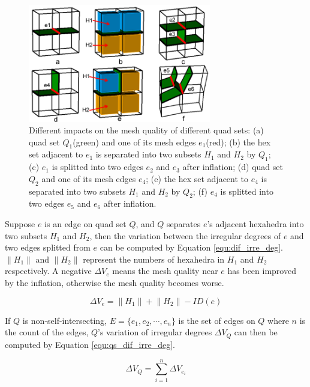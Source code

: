 \documentclass[final,5p,times,twocolumn]{elsarticle}
\begin{document}
\begin{figure}[htbp]
\begin{center}
\includegraphics[width=8cm]{figures/quality_impact_qs.png}
\caption{Different impacts on the mesh quality of different quad sets: (a) quad set $Q_1$(green) and one of its mesh edges $e_1$(red); (b) the hex set adjacent to $e_1$ is separated into two subsets $H_1$ and $H_2$ by $Q_1$; (c) $e_1$ is splitted into two edges $e_2$ and $e_3$ after inflation; (d) quad set $Q_2$ and one of its mesh edges $e_4$; (e) the hex set adjacent to $e_4$ is separated into two subsets $H_1$ and $H_2$ by $Q_2$; (f) $e_4$ is splitted into two edges $e_5$ and $e_6$ after inflation.}
\label{fig:quality_impact_qs}
\end{center}
\end{figure}

Suppose $e$ is an edge on quad set $Q$, and $Q$ separates $e$'s adjacent hexahedra into two subsets $H_1$ and $H_2$, then the variation between the irregular degrees of $e$ and two edges splitted from $e$ can be computed by Equation \ref{equ:dif_irre_deg}. $\left \| H_1 \right \|$ and $\left \| H_2 \right \|$ represent the numbers of hexahedra in $H_1$ and $H_2$ respectively. A negative $\Delta V_e$ means the mesh quality near $e$ has been improved by the inflation, otherwise the mesh quality becomes worse.

\begin{equation}
\label{equ:dif_irre_deg}
\Delta V_e=\left \| H_1 \right \| + \left \| H_2 \right \|-ID(e)
\end{equation}

If $Q$ is non-self-intersecting, $E=\{e_1,e_2,\cdots,e_n\}$ is the set of edges on $Q$ where $n$ is the count of the edges, $Q$'s variation of irregular degrees $\Delta V_Q$ can then be computed by Equation \ref{equ:qs_dif_irre_deg}.

\begin{equation}
\label{equ:qs_dif_irre_deg}
\Delta V_Q=\sum_{i=1}^{n}\Delta V_{e_i}
\end{equation}
\end{document}
